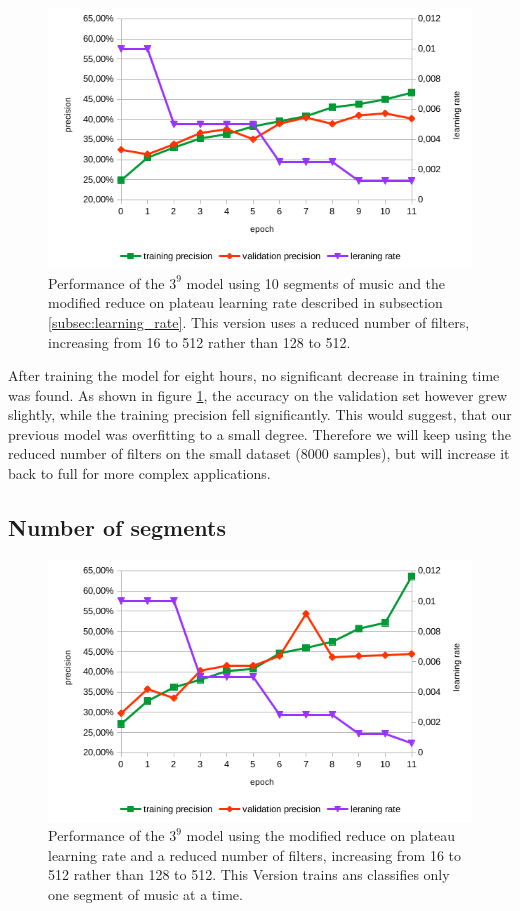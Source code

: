 \begin{figure}[!htb]
	\centering
	\includegraphics[width=.9\linewidth]{images/sample-dcnn-m3-n9-seg10-16_512-plateau_mod.png}
	\caption{Performance of the $3^9$ model using 10 segments of music and the modified reduce on plateau learning rate described in subsection \ref{subsec:learning_rate}. This version uses a reduced number of filters, increasing from 16 to 512 rather than 128 to 512.}
	\label{fig:sample-dcnn-m3-n9-seg10-16_512-plateau_mod}
\end{figure}

After training the model for eight hours, no significant decrease in training time was found. As shown in figure \ref{fig:sample-dcnn-m3-n9-seg10-16_512-plateau_mod}, the accuracy on the validation set however grew slightly, while the training precision fell significantly. This would suggest, that our previous model was overfitting to a small degree. Therefore we will keep using the reduced number of filters on the small dataset (8000 samples), but will increase it back to full for more complex applications.



\subsection{Number of segments}
\begin{figure}[!htb]
	\centering
	\includegraphics[width=.9\linewidth]{images/sample-dcnn-m3-n9-seg1-16_512-plateau_mod.png}
	\caption{Performance of the $3^9$ model using the modified reduce on plateau learning rate and a reduced number of filters, increasing from 16 to 512 rather than 128 to 512. This Version trains ans classifies only one segment of music at a time.}
	\label{fig:sample-dcnn-m3-n9-seg1-16_512-plateau_mod}
\end{figure}

